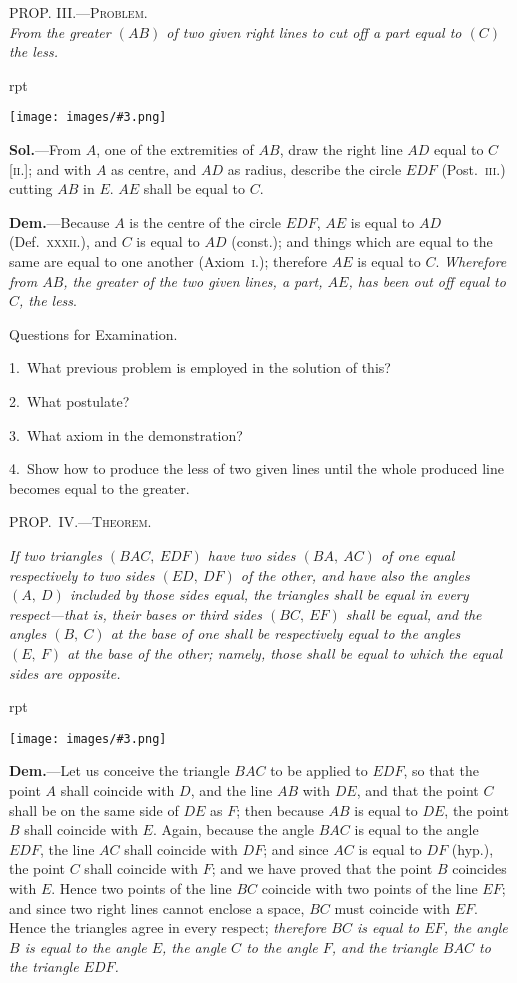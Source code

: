 \documentclass[oneside]{book}
\newcounter{wrapwidth}
\newcommand\myprop[2]{
\bigskip\Needspace*{4\baselineskip}\begin{center}\textsc{#1}\\\medskip\emph{#2}\par\end{center}
}
\newcommand\mypropl[2]{
\bigskip\Needspace*{4\baselineskip}\begin{center}\textsc{#1}\end{center}
\hspace{\parindent}\emph{#2}\par\medskip
}
\newcommand\exhead[1]{
\Needspace*{5\baselineskip}\begin{center}
\textsf{#1}
\end{center}
}
\newcommand\imgflow[3]{
\setcounter{wrapwidth}{#1}
\begin{wrapfigure}[#2]{r}{\value{wrapwidth}pt}
\begin{center}
\vspace{-0.3in}
\texttt{[image: images/\#3.png]}
\end{center}
\end{wrapfigure}
}
\begin{document}
\myprop{PROP\@. III\@.---Problem.}{From the greater $(AB)$ of two given right lines to cut off
a part equal to $(C)$ the less.}

\imgflow{133}{10}{f014}
\textbf{Sol.}---From $A$, one of the extremities of $AB$, draw
the right line $AD$ equal to $C$
[\textsc{ii.}]; and with $A$ as centre,
and $AD$ as radius, describe
the circle $EDF$ (Post.~\textsc{iii.})
cutting $AB$ in $E$. $AE$ shall
be equal to $C$.

\textbf{Dem.}---Because $A$ is the
centre of the circle $EDF$, $AE$
is equal to $AD$ (Def.~\textsc{xxxii.}),
and $C$ is equal to $AD$ (const.); and things which are
equal to the same are equal to one another (Axiom~\textsc{i.});
therefore $AE$ is equal to $C$. \emph{Wherefore from $AB$, the
greater of the two given lines, a part, $AE$, has been out off
equal to $C$, the less}.


\exhead{Questions for Examination.}

\begin{footnotesize}
1.~What previous problem is employed in the solution of this?

2.~What postulate?

3.~What axiom in the demonstration?

4.~Show how to produce the less of two given lines until the
whole produced line becomes equal to the greater.
\par\end{footnotesize}


\mypropl{PROP\@.~IV\@.---Theorem.}{If two triangles $(BAC,\ EDF)$ have two sides $(BA,\ AC)$
of one equal respectively to two sides $(ED,\ DF)$ of the
other, and have also the angles $(A,\ D)$ included by those
sides equal, the triangles shall be equal in every respect---that
is, their bases or third sides $(BC,\ EF)$ shall be equal,
and the angles $(B,\ C)$ at the base of one shall be respectively
equal to the angles $(E,\ F)$ at the base of the other;
namely, those shall be equal to which the equal sides are
opposite.}

\imgflow{163}{8}{f015}

\textbf{Dem.}---Let us conceive the triangle $BAC$ to be applied
to $EDF$, so that the
point $A$ shall coincide with
$D$, and the line $AB$ with
$DE$, and that the point $C$
shall be on the same side
of $DE$ as $F$; then because
$AB$ is equal to $DE$, the
point $B$ shall coincide
with $E$. Again, because the angle $BAC$ is equal to
the angle $EDF$, the line $AC$ shall coincide with $DF$;
and since $AC$ is equal to $DF$ (hyp.), the point $C$ shall
coincide with $F$; and we have proved that the point
$B$ coincides with $E$. Hence two points of the line $BC$
coincide with two points of the line $EF$; and since two
right lines cannot enclose a space, $BC$ must coincide
with $EF$. Hence the triangles agree in every respect;
\textit{therefore $BC$ is equal to $EF$, the angle $B$ is equal to the
angle $E$, the angle $C$ to the angle $F$, and the triangle $BAC$
to the triangle $EDF$.}
\end{document}

